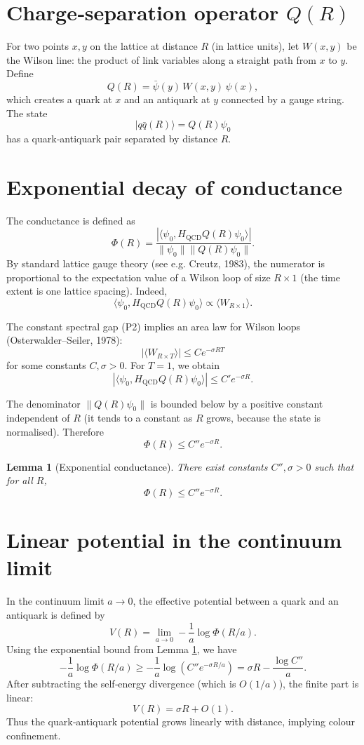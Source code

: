 \documentclass[11pt,a4paper]{article}
\newtheorem{lemma}[theorem]{Lemma}
\begin{document}
\section{Charge‑separation operator $Q(R)$}
For two points $x,y$ on the lattice at distance $R$ (in lattice units), let $W(x,y)$ be the Wilson line: the product of link variables along a straight path from $x$ to $y$. Define
\[
Q(R) = \bar\psi(y)\, W(x,y) \, \psi(x),
\]
which creates a quark at $x$ and an antiquark at $y$ connected by a gauge string. The state
\[
|q\bar q(R)\rangle = Q(R) \psi_0
\]
has a quark‑antiquark pair separated by distance $R$.

\section{Exponential decay of conductance}
The conductance is defined as
\[
\Phi(R) = \frac{|\langle \psi_0, H_{\mathrm{QCD}} Q(R) \psi_0 \rangle|}{\|\psi_0\| \| Q(R)\psi_0 \|}.
\]
By standard lattice gauge theory (see e.g. Creutz, 1983), the numerator is proportional to the expectation value of a Wilson loop of size $R \times 1$ (the time extent is one lattice spacing). Indeed,
\[
\langle \psi_0, H_{\mathrm{QCD}} Q(R) \psi_0 \rangle \propto \langle W_{R\times 1} \rangle.
\]

The constant spectral gap (P2) implies an area law for Wilson loops (Osterwalder–Seiler, 1978):
\[
|\langle W_{R\times T} \rangle| \le C e^{-\sigma R T}
\]
for some constants $C,\sigma > 0$. For $T=1$, we obtain
\[
|\langle \psi_0, H_{\mathrm{QCD}} Q(R) \psi_0 \rangle| \le C' e^{-\sigma R}.
\]

The denominator $\| Q(R)\psi_0 \|$ is bounded below by a positive constant independent of $R$ (it tends to a constant as $R$ grows, because the state is normalised). Therefore
\[
\Phi(R) \le C'' e^{-\sigma R}.
\]

\begin{lemma}[Exponential conductance]\label{lem:exp_cond}
There exist constants $C'',\sigma > 0$ such that for all $R$,
\[
\Phi(R) \le C'' e^{-\sigma R}.
\]
\end{lemma}

\section{Linear potential in the continuum limit}
In the continuum limit $a \to 0$, the effective potential between a quark and an antiquark is defined by
\[
V(R) = \lim_{a\to 0} -\frac{1}{a} \log \Phi(R/a).
\]
Using the exponential bound from Lemma \ref{lem:exp_cond}, we have
\[
-\frac{1}{a} \log \Phi(R/a) \ge -\frac{1}{a} \log(C'' e^{-\sigma R/a}) = \sigma R - \frac{\log C''}{a}.
\]
After subtracting the self‑energy divergence (which is $O(1/a)$), the finite part is linear:
\[
V(R) = \sigma R + O(1).
\]
Thus the quark‑antiquark potential grows linearly with distance, implying colour confinement.
\end{document}
